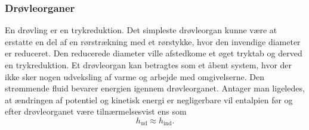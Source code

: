 \subsubsection{Drøvleorganer}
En drøvling er en trykreduktion. Det simpleste drøvleorgan kunne være at erstatte en del af en rørstrækning med et rørstykke, hvor den invendige diameter er reduceret. Den reducerede diameter ville afstedkome et øget tryktab og derved en trykreduktion. Et drøvleorgan kan betragtes som et åbent system, hvor der ikke sker nogen udveksling af varme og arbejde med omgivelserne. Den strømmende fluid bevarer energien igennem drøvleorganet. Antager man ligeledes, at ændringen af potentiel og kinetisk energi er negligerbare vil entalpien før og efter drøvleorganet være tilnærmelsesvist ens som
\[ 
h_{\text{ud}} \approx h_{\text{ind}}
.\]

